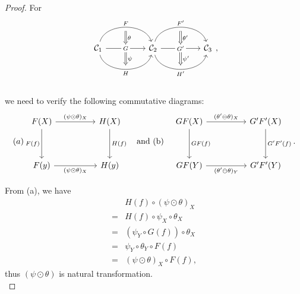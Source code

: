 \documentclass{article}
\begin{document}
\begin{proof}
	For
	\[\begin{tikzcd}
		\C_1
		\arrow[bend left=75, rr, "F", ""' name=F] \arrow[rr, "G" description, "" name=G, ""' name=GG] \arrow[bend right=75, rr, "H"', "" name=H] & &
		\arrow[Rightarrow, from=F, to=G, "\theta"] \arrow[Rightarrow, from=GG, to=H, "\psi"]
		\C_2 \arrow[bend left=75, rr, "F'", ""' name=F'] \arrow[rr, "G'" description, "" name=G', ""' name=GG'] \arrow[bend right=75, rr, "H'"', "" name=H'] & &
		\arrow[Rightarrow, from=F', to=G', "\theta'"] \arrow[Rightarrow, from=GG', to=H', "\psi'"] \C_3
	\end{tikzcd},\]\\
	we need to verify the following commutative diagrams:
		\[(a)\begin{tikzcd}
				F(X) \arrow[dd,"F(f)"'] \arrow[rr,"(\psi\odot\theta)_X"] && H(X) \arrow[dd,"H(f)"]\\ && \\
				F(y) \arrow[rr,"(\psi\odot\theta)_X"'] && H(y)
			\end{tikzcd}\quad\text{and (b)}\quad\begin{tikzcd}
				GF(X) \arrow[dd,"GF(f)"] \arrow[rr,"(\theta'\ominus\theta)_X"] && G'F'(X) \arrow[dd,"G'F'(f)"]\\ && \\
				GF(Y) \arrow[rr,"(\theta'\ominus\theta)_Y"'] && G'F'(Y)
		\end{tikzcd}.\]
		
	From (a), we have
	\begin{align}
		& H(f)\circ(\psi\odot\theta)_X\tag{Assumption}\\
		=& H(f)\circ\psi_X\circ\theta_X\tag{Def: vertical composition}\\
		=& (\psi_Y\circ G(f))\circ\theta_X\tag{Property of natural transformation $\psi$}\\
		=& \psi_Y\circ\theta_Y\circ F(f)\tag{Property of natural transformation $\theta$}\\
		=& (\psi\odot\theta)_X\circ F(f),\tag{Def: vertical composition}
	\end{align}
	thus $(\psi\odot\theta)$ is natural transformation.\\
		

\end{proof}
\end{document}
